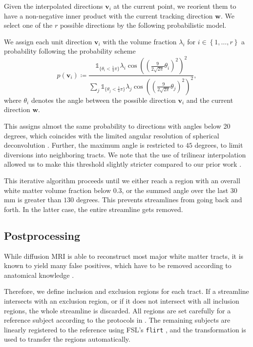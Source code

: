 Given the interpolated directions $\mathbf{v}_i$ at the current point, we
reorient them to have a non-negative inner product with the current tracking
direction $\mathbf{w}$. We select one of the $r$ possible directions by the
following probabilistic model.

We assign each unit direction $\mathbf{v}_i$ with the volume fraction
$\lambda_i$ for $i \in \left\{ 1 , \dots , r \right\}$ a probability following the probability
scheme 
\[
	p \left( \mathbf{v}_i \right) \coloneqq \frac{ \mathbb{1}_{\lbrace\theta_i <
		\frac{1}{4} \pi \rbrace} \lambda_i \cos \left( \left( \frac{9}{2\sqrt{2
\pi}} \theta_i \right)^2 \right)^2}{\sum_j \mathbb{1}_{\lbrace\theta_j <
		\frac{1}{4} \pi \rbrace} \lambda_j \cos \left( \left( \frac{9}{2\sqrt{2
\pi}} \theta_j \right)^2 \right)^2 }, 
\]
where $\theta_i$ denotes the angle between the possible direction $\mathbf{v}_i$
and the current direction $\mathbf{w}$. 

This assigns almost the same probability to directions with angles below 20 degrees, which coincides with the limited angular resolution of
spherical deconvolution \cite{TOURNIER20071459}. Further, the maximum angle is
restricted to $45$ degrees, to limit diversions into neighboring tracts. We note that the use of trilinear interpolation allowed us to make this threshold slightly stricter compared to our prior work \cite{Gruen:2021}.

This iterative algorithm proceeds until we either reach a region with an overall white matter volume fraction below $0.3$, or the summed angle over the last $30$ mm is greater than
$130$ degrees. This prevents streamlines from going back and forth. In the latter case,
the entire streamline gets removed. 

\subsection{Postprocessing}
While diffusion MRI is able to reconstruct most major white
matter tracts, it is known to yield many false
positives, which have to be removed according to anatomical knowledge
\cite{MaierHein:2017}. %

Therefore, we define inclusion and exclusion regions for each tract. If a streamline intersects with an exclusion region, or if it  does not intersect with all inclusion regions, the whole streamline is discarded. All regions
are set carefully for a reference subject according to the protocols in
\cite{Wakana:2007}.
The remaining subjects are linearly registered to the reference using FSL's \texttt{flirt} \cite{FSL}, and the transformation is used to transfer the regions automatically.


